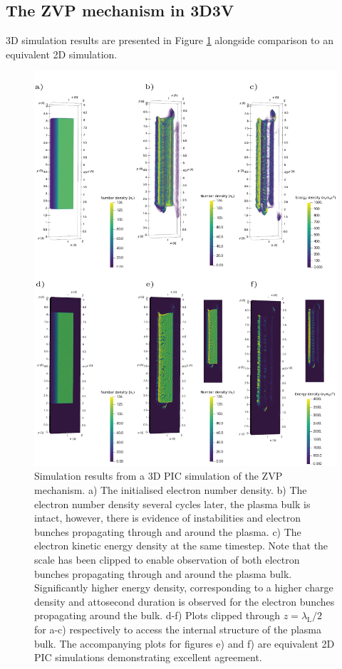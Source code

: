 \subsection{The ZVP mechanism in 3D3V}\label{sec:zvp-3Dsimulations}
3D simulation results are presented in Figure \ref{fig:zvp3d} alongside comparison to an equivalent 2D simulation.
\begin{figure}
	\centering
	\includegraphics[width=0.9\linewidth]{figures/zvp/zvp_3D}
	\caption[The numerical simulation using a 3D \ac{PIC} code of the \ac{ZVP} mechanism.]{Simulation results from a 3D \ac{PIC} simulation of the \ac{ZVP} mechanism. a) The initialised electron number density. b) The electron number density several cycles later, the plasma bulk is intact, however, there is evidence of instabilities and electron bunches propagating through and around the plasma. c) The electron kinetic energy density at the same timestep. Note that the scale has been clipped to enable observation of both electron bunches propagating through and around the plasma bulk. Significantly higher energy density, corresponding to a higher charge density and attosecond duration is observed for the electron bunches propagating around the bulk. d-f) Plots clipped through $z=\lambda_\mathrm{L}/2$ for a-c) respectively to access the internal structure of the plasma bulk. The accompanying plots for figures e) and f) are equivalent 2D PIC simulations demonstrating excellent agreement.}
	\label{fig:zvp3d}
\end{figure}
